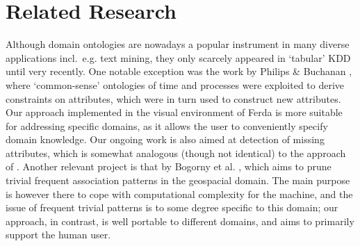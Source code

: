 \section{Related Research} \label{Related}

Although domain ontologies are nowadays a popular instrument in many diverse applications incl.~e.g. text mining, they only scarcely appeared in `tabular' KDD until very recently.
One notable exception was the work by Philips \& Buchanan \cite{Philips}, where `common-sense' ontologies of time and processes were exploited to
derive constraints on attributes, which were in turn used to construct new attributes.
Our approach implemented in the visual environment of Ferda is more suitable for addressing specific domains, as it allows the user to conveniently specify domain knowledge.
Our ongoing work is also aimed at detection of missing attributes, which is somewhat analogous (though not identical) to the approach of \cite{Philips}.
Another relevant project is that by Bogorny et al. \cite{Bogorny}, which aims to prune trivial frequent association patterns in the geospacial domain. The main purpose is however there to cope with computational complexity for the machine, and the issue of frequent trivial patterns is to some degree specific to this domain; our approach, in contrast, is well portable to different domains, and aims to primarily support the human user.


